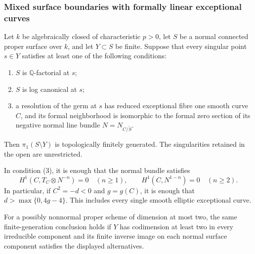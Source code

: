\subsubsection{Mixed surface boundaries with formally linear exceptional curves}

\begin{theorem}
\label{D:formal-cone-mixed-boundary}
Let $k$ be algebraically closed of characteristic $p>0$, let
$S$ be a normal connected proper surface over $k$, and let
$Y\subset S$ be finite.  Suppose that every singular point
$s\in Y$ satisfies at least one of the following conditions:
\begin{enumerate}
\item $S$ is $\mathbb Q$-factorial at $s$;
\item $S$ is log canonical at $s$;
\item a resolution of the germ at $s$ has reduced exceptional
      fibre one smooth curve $C$, and its formal neighborhood
      is isomorphic to the formal zero section of its negative
      normal line bundle $N=N_{C/\widetilde S}$.
\end{enumerate}
Then $\pi_1(S\setminus Y)$ is topologically finitely generated.
The singularities retained in the open are unrestricted.

In condition (3), it is enough that the normal bundle satisfies
\[
 H^1(C,T_C\otimes N^{-n})=0\quad(n\geq1),
 \qquad
 H^1(C,N^{1-n})=0\quad(n\geq2).
\]
In particular, if $C^2=-d<0$ and $g=g(C)$, it is enough that
$d>\max\{0,4g-4\}$.  This includes every single smooth
elliptic exceptional curve.

For a possibly nonnormal proper scheme of dimension at most
two, the same finite-generation conclusion holds if $Y$ has
codimension at least two in every irreducible component and
its finite inverse image on each normal surface component
satisfies the displayed alternatives.
\end{theorem}
